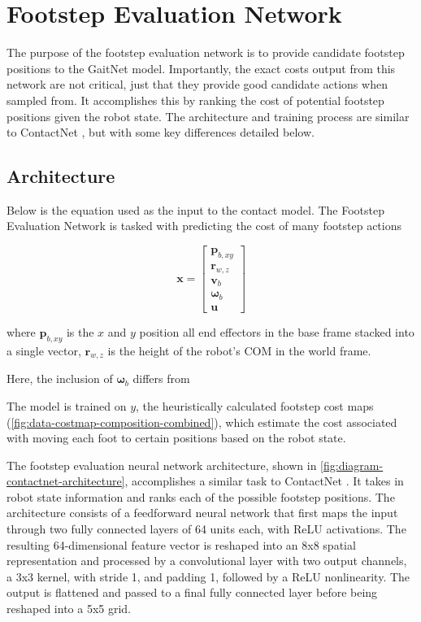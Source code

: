 \section{Footstep Evaluation Network}

The purpose of the footstep evaluation network is to provide
candidate footstep positions to the GaitNet model. Importantly,
the exact costs output from this network are not critical, just that
they provide good candidate actions when sampled from. It accomplishes
this by ranking the cost of potential footstep positions given the
robot state. The architecture and training process are similar to
ContactNet \cite{bratta_contactnet_2024}, but with some key differences
detailed below.

\subsection{Architecture}

Below is the equation used as the input to the contact model.
The Footstep Evaluation Network is tasked with predicting the cost
of many footstep actions

\[
  \mathbf{x} =
  \begin{bmatrix}
    \mathbf p_{b,xy} \\
    \mathbf r_{w,z} \\
    \mathbf v_b \\
    \mathbf \omega_b \\
    \mathbf u
  \end{bmatrix}
\]

where
$\mathbf p_{b,xy}$ is the $x$ and $y$ position all end effectors in
the base frame stacked into a single vector,
$\mathbf r_{w,z}$ is the height of the robot's COM in the world frame.

Here, the inclusion of $\mathbf \omega_b$ differs from
\cite{bratta_contactnet_2024}

The model is trained on $y$, the heuristically calculated footstep
cost maps (\autoref{fig:data-costmap-composition-combined}), which estimate
the cost associated with moving each foot to certain positions based on the
robot state.

The footstep evaluation neural network architecture, shown in
\autoref{fig:diagram-contactnet-architecture}, accomplishes a similar
task to ContactNet \cite{bratta_contactnet_2024}. It takes in robot state
information and ranks each of the possible footstep
positions. The architecture consists of a feedforward neural
network that first maps the input through two fully connected layers
of 64 units each, with ReLU activations. The resulting 64-dimensional
feature vector is reshaped into an 8x8 spatial representation and
processed by a convolutional layer with two output channels, a
3x3 kernel, with stride 1, and padding 1, followed by a ReLU
nonlinearity. The output is flattened and passed to a final
fully connected layer before being reshaped into a 5x5 grid.

